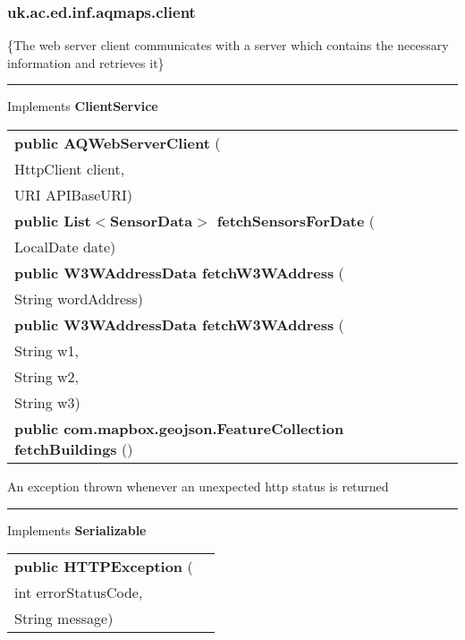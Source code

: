 \subsubsection{ uk.ac.ed.inf.aqmaps.client }
 { \{The web server client communicates with a server which contains the necessary information and retrieves it\}
 
\vspace*{4pt} \hrule \vspace*{3pt}
Implements \textbf{ ClientService }
\begin{tabular}{ p{3in}|m{3.4in}}
\textbf{public AQWebServerClient } (\\ \hspace*{ 5pt} HttpClient client,\\\hspace*{ 5pt} URI APIBaseURI) & \\ \hline 
\textbf{public List$<$SensorData$>$ fetchSensorsForDate } (\\ \hspace*{ 5pt} LocalDate date) & \\ \hline 
\textbf{public W3WAddressData fetchW3WAddress } (\\ \hspace*{ 5pt} String wordAddress) & \\ \hline 
\textbf{public W3WAddressData fetchW3WAddress } (\\ \hspace*{ 5pt} String w1,\\\hspace*{ 5pt} String w2,\\\hspace*{ 5pt} String w3) & \\ \hline 
\textbf{public com.mapbox.geojson.FeatureCollection fetchBuildings} () & \\ \hline 
\end{tabular}
}
 { An exception thrown whenever an unexpected http status is returned
 
\vspace*{4pt} \hrule \vspace*{3pt}
Implements \textbf{ Serializable }
\begin{tabular}{ p{3in}|m{3.4in}}
\textbf{public HTTPException } (\\ \hspace*{ 5pt} int errorStatusCode,\\\hspace*{ 5pt} String message) & \\ \hline 
\end{tabular}
}
